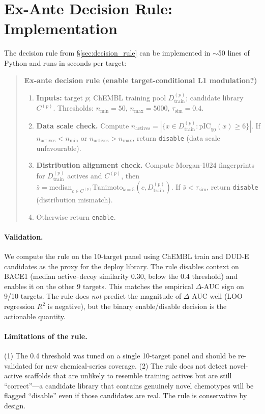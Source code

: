 \documentclass{article}
\begin{document}
\section{Ex-Ante Decision Rule: Implementation}
\label{app:decision_rule}

The decision rule from \S\ref{sec:decision_rule} can be implemented in $\sim$50 lines of Python and runs in seconds per target:

\begin{quote}
\textbf{Ex-ante decision rule (enable target-conditional L1 modulation?)}
\begin{enumerate}[noitemsep,topsep=1pt,leftmargin=*]
\item \textbf{Inputs:} target $p$; ChEMBL training pool $D_{\text{train}}^{(p)}$; candidate library $C^{(p)}$. Thresholds: $n_{\min}=50$, $n_{\max}=5000$, $\tau_{\text{sim}}=0.4$.
\item \textbf{Data scale check.} Compute $n_{\text{actives}} = |\{x \in D_{\text{train}}^{(p)} : \text{pIC}_{50}(x) \geq 6\}|$. If $n_{\text{actives}} < n_{\min}$ or $n_{\text{actives}} > n_{\max}$, return \texttt{disable} (data scale unfavourable).
\item \textbf{Distribution alignment check.} Compute Morgan-1024 fingerprints for $D_{\text{train}}^{(p)}$ actives and $C^{(p)}$, then $\bar{s} = \mathrm{median}_{c \in C^{(p)}} \mathrm{Tanimoto}_{k=5}(c, D_{\text{train}}^{(p)})$. If $\bar{s} < \tau_{\text{sim}}$, return \texttt{disable} (distribution mismatch).
\item Otherwise return \texttt{enable}.
\end{enumerate}
\end{quote}

\paragraph{Validation.} We compute the rule on the 10-target panel using ChEMBL train and DUD-E candidates as the proxy for the deploy library. The rule disables context on BACE1 (median active--decoy similarity 0.30, below the 0.4 threshold) and enables it on the other 9 targets. This matches the empirical $\Delta$-AUC sign on 9/10 targets. The rule does \emph{not} predict the magnitude of $\Delta$ AUC well (LOO regression $R^2$ is negative), but the binary enable/disable decision is the actionable quantity.

\paragraph{Limitations of the rule.} (1) The 0.4 threshold was tuned on a single 10-target panel and should be re-validated for new chemical-series coverage. (2) The rule does not detect novel-active scaffolds that are unlikely to resemble training actives but are still ``correct''---a candidate library that contains genuinely novel chemotypes will be flagged ``disable'' even if those candidates are real. The rule is conservative by design.
\end{document}
